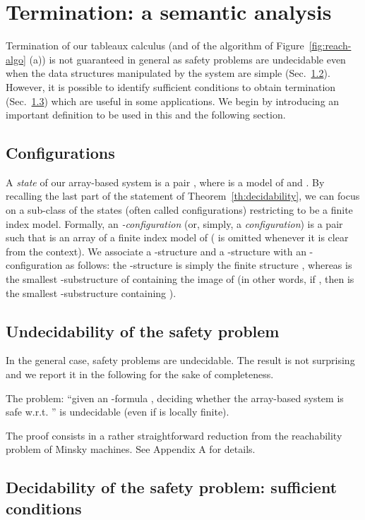 \documentclass{LMCS}
\theoremstyle{plain}\newtheorem{assumption}[thm]{Assumption}
\theoremstyle{plain}\newtheorem{proposition}[thm]{Proposition}
\theoremstyle{plain}\newtheorem{property}[thm]{Property}
\theoremstyle{plain}\newtheorem{example}[thm]{Example}
\theoremstyle{plain}\newtheorem{claim}[thm]{Claim}
\theoremstyle{plain}\newtheorem{lemma}[thm]{Lemma}
\begin{document}
\section{Termination: a semantic analysis}
\label{sec:term}
Termination of our tableaux calculus (and of the algorithm of
Figure~\ref{fig:reach-algo} (a)) is not guaranteed in general as
safety problems are undecidable even when the data structures
manipulated by the system are simple (Sec.~\ref{subsec:undec}).
However, it is possible to identify sufficient conditions to obtain
termination (Sec.~\ref{subsec:dec}) which are useful in some
applications.  We begin by introducing an important definition to be
used in this and the following section.


\subsection{Configurations}
\label{subsec:configurations}
A \emph{state} of our array-based system  is a pair
, where  is a model of  and
.  By recalling the last part of the
statement of Theorem~\ref{th:decidability}, we can focus on a
sub-class of the states (often called configurations) restricting
 to be a finite index model.  Formally, an
\emph{-configuration} (or, simply, a \emph{configuration}) is a
pair  such that  is an array of a finite index model
 of  ( is omitted whenever it is clear from the
context).  We associate a -structure  and a
-structure  with an -configuration  as
follows: the -structure  is simply the finite structure
, whereas  is the smallest -substructure of
 containing the image of  (in other words, if , then  is the smallest
-substructure containing ).


\subsection{Undecidability of the safety problem}
\label{subsec:undec}
In the general case, safety problems are undecidable. The result is
not surprising and we report it in the following for the sake of
completeness.
\begin{thm}
  \label{th:undecidability}
  The problem: ``given an -formula , deciding whether
  the array-based system  is safe w.r.t. '' is undecidable
  (even if  is locally finite).
\end{thm}
The proof consists in a rather straightforward reduction from the
reachability problem of Minsky machines.  See Appendix A for details.

\subsection{Decidability of the safety problem: sufficient conditions}
\label{subsec:dec}
\end{document}
